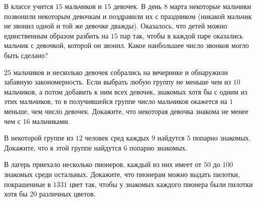 \begin{exersize}
	В классе учится $15$ мальчиков и $15$ девочек. В день $8$ марта некоторые мальчики позвонили некоторым девочкам и поздравили их с праздником (никакой мальчик не звонил одной и той же девочке дважды). Оказалось, что детей можно единственным образом разбить на $15$ пар так, чтобы в каждой паре оказались мальчик с девочкой, которой он звонил. Какое наибольшее число звонков могло быть сделано?
\end{exersize}	  


\begin{exersize}
	$25$ мальчиков и несколько девочек собрались на вечеринке и обнаружили забавную закономерность. Если выбрать любую группу не меньше чем из $10$ мальчиков, а потом добавить к ним всех девочек, знакомых хотя бы с одним из этих мальчиков, то в получившейся группе число мальчиков окажется на $1$ меньше, чем число девочек. Докажите, что некоторая девочка знакома не менее чем с $16$ мальчиками.
\end{exersize}	 

\begin{exersize}
	В некоторой группе из $12$ человек сред каждых $9$ найдутся $5$ попарно знакомых. Докажите, что в этой группе найдутся $6$ попарно знакомых.
\end{exersize}	 

\begin{exersize}
	В лагерь приехало несколько пионеров, каждый из них имеет от $50$ до $100$ знакомых среди остальных. Докажите, что пионерам можно выдать пилотки, покрашенные в $1331$ цвет так, чтобы у знакомых каждого пионера были пилотки хотя бы $20$ различных цветов.
\end{exersize}	 